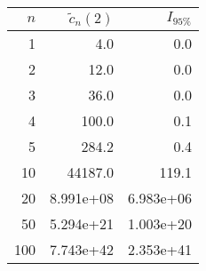 \begin{tabular}{rrr}
\toprule
 $n$ &  $\tilde{c}_n(2)$ &  $I_{95\%}$ \\
\midrule
   1 &               4.0 &         0.0 \\
   2 &              12.0 &         0.0 \\
   3 &              36.0 &         0.0 \\
   4 &             100.0 &         0.1 \\
   5 &             284.2 &         0.4 \\
  10 &           44187.0 &       119.1 \\
  20 &         8.991e+08 &   6.983e+06 \\
  50 &         5.294e+21 &   1.003e+20 \\
 100 &         7.743e+42 &   2.353e+41 \\
\bottomrule
\end{tabular}
